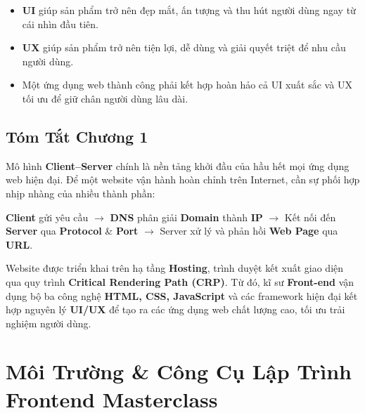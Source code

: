 \documentclass[11pt,oneside]{book}
\begin{document}
\begin{warnBox}
\begin{itemize}[leftmargin=1.2em, itemsep=2pt, parsep=0pt]
    \item \textbf{UI} giúp sản phẩm trở nên đẹp mắt, ấn tượng và thu hút người dùng ngay từ cái nhìn đầu tiên.
    \item \textbf{UX} giúp sản phẩm trở nên tiện lợi, dễ dùng và giải quyết triệt để nhu cầu người dùng.
    \item Một ứng dụng web thành công phải kết hợp hoàn hảo cả UI xuất sắc và UX tối ưu để giữ chân người dùng lâu dài.
\end{itemize}
\end{warnBox}

\section{Tóm Tắt Chương 1}

\begin{noteBox}
Mô hình \textbf{Client--Server} chính là nền tảng khởi đầu của hầu hết mọi ứng dụng web hiện đại. Để một website vận hành hoàn chỉnh trên Internet, cần sự phối hợp nhịp nhàng của nhiều thành phần: 
\begin{center}
\textbf{Client} gửi yêu cầu $\rightarrow$ \textbf{DNS} phân giải \textbf{Domain} thành \textbf{IP} $\rightarrow$ Kết nối đến \textbf{Server} qua \textbf{Protocol} \& \textbf{Port} $\rightarrow$ Server xử lý và phản hồi \textbf{Web Page} qua \textbf{URL}.
\end{center}
Website được triển khai trên hạ tầng \textbf{Hosting}, trình duyệt kết xuất giao diện qua quy trình \textbf{Critical Rendering Path (CRP)}. Từ đó, kĩ sư \textbf{Front-end} vận dụng bộ ba công nghệ \textbf{HTML, CSS, JavaScript} và các framework hiện đại kết hợp nguyên lý \textbf{UI/UX} để tạo ra các ứng dụng web chất lượng cao, tối ưu trải nghiệm người dùng.
\end{noteBox}



\chapter{Môi Trường \& Công Cụ Lập Trình Frontend Masterclass}
\label{chap:dev_environment}
\end{document}
